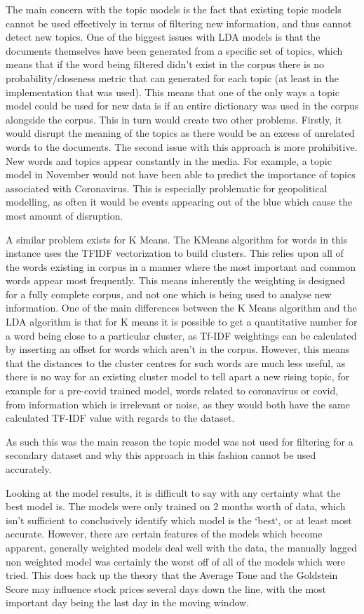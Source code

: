 The main concern with the topic models is the fact that existing topic models cannot be used effectively in terms of filtering new information, and thus cannot detect new topics. One of the biggest issues with LDA models is that the documents themselves have been generated from a specific set of topics, which means that if the word being filtered didn't exist in the corpus there is no probability/closeness metric that can generated for each topic (at least in the implementation that was used). This means that one of the only ways a topic model could be used for new data is if an entire dictionary was used in the corpus alongside the corpus. This in turn would create two other problems. Firstly, it would disrupt the meaning of the topics as there would be an excess of unrelated words to the documents. The second issue with this approach is more prohibitive. New words and topics appear constantly in the media. For example, a topic model in November would not have been able to predict the importance of topics associated with Coronavirus. This is especially problematic for geopolitical modelling, as often it would be events appearing out of the blue which cause the most amount of disruption.  

A similar problem exists for K Means. The KMeans algorithm for words in this instance uses the TFIDF vectorization to build clusters. This relies upon all of the words existing in corpus in a manner where the most important and common words appear most frequently. This means inherently the weighting is designed for a fully complete corpus, and not one which is being used to analyse new information. One of the main differences between the K Means algorithm and the LDA algorithm is that for K means it is possible to get a quantitative number for a word being close to a particular cluster, as Tf-IDF weightings can be calculated by inserting an offset for words which aren't in the corpus. However, this means that the distances to the cluster centres for such words are much less useful, as there is no way for an existing cluster model to tell apart a new rising topic, for example for a pre-covid trained model, words related to coronavirus or covid, from information which is irrelevant or noise, as they would both have the same calculated TF-IDF value with regards to the dataset.

As such this was the main reason the topic model was not used for filtering for a secondary dataset and why this approach in this fashion cannot be used accurately. 

Looking at the model results, it is difficult to say with any certainty what the best model is. The models were only trained on 2 months worth of data, which isn't sufficient to conclusively identify which model is the `best`, or at least most accurate. However, there are certain features of the models which become apparent, generally weighted models deal well with the data, the manually lagged non weighted model was certainly the worst off of all of the models which were tried. This does back up the theory that the Average Tone and the Goldstein Score may influence stock prices several days down the line, with the most important day being the last day in the moving window.

